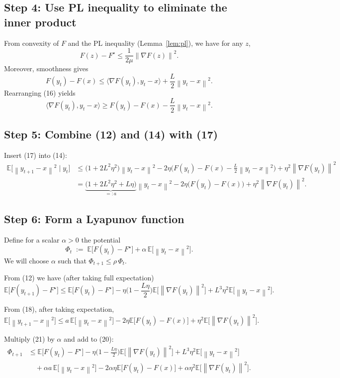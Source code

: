 \documentclass{article}
\newcommand{\EE}{\mathbb{E}}
\newcommand{\norm}[1]{\left\|#1\right\|}
\newcommand{\inner}[2]{\langle #1,#2\rangle}
\begin{document}
\subsection*{Step 4: Use PL inequality to eliminate the inner product}
From convexity of $F$ and the PL inequality (Lemma~\ref{lem:pl}), we have for any $z$,
\[
F(z)-F^\star \le \frac{1}{2\mu}\norm{\nabla F(z)}^{2}.
\tag{15}
\]
Moreover, smoothness gives
\[
F(y_t)-F(x) \le \inner{\nabla F(y_t)}{y_t-x}
          +\frac{L}{2}\norm{y_t-x}^{2}.
\tag{16}
\]
Rearranging (16) yields
\[
\inner{\nabla F(y_t)}{y_t-x}
   \ge F(y_t)-F(x)-\frac{L}{2}\norm{y_t-x}^{2}.
\tag{17}
\]

\subsection*{Step 5: Combine (12) and (14) with (17)}
Insert (17) into (14):
\[
\begin{aligned}
\EE\!\big[\norm{y_{t+1}-x}^{2}\mid y_t\big]
&\le \big(1+2L^{2}\eta^{2}\big)\norm{y_t-x}^{2}
   -2\eta\Big(F(y_t)-F(x)-\frac{L}{2}\norm{y_t-x}^{2}\Big)
   +\eta^{2}\norm{\nabla F(y_t)}^{2}\\
&= \underbrace{\big(1+2L^{2}\eta^{2}+L\eta\big)}_{=:a}\norm{y_t-x}^{2}
   -2\eta\big(F(y_t)-F(x)\big)
   +\eta^{2}\norm{\nabla F(y_t)}^{2}.
\end{aligned}
\tag{18}
\]

\subsection*{Step 6: Form a Lyapunov function}
Define for a scalar $\alpha>0$ the potential
\[
\Phi_t \;:=\; \EE\!\big[F(y_t)-F^\star\big]
            +\alpha\,\EE\!\big[\norm{y_t-x}^{2}\big].
\tag{19}
\]
We will choose $\alpha$ such that $\Phi_{t+1}\le\rho\,\Phi_t$.

From (12) we have (after taking full expectation)
\[
\EE\!\big[F(y_{t+1})-F^\star\big]
\le \EE\!\big[F(y_t)-F^\star\big]
   -\eta\Big(1-\frac{L\eta}{2}\Big)\EE\!\big[\norm{\nabla F(y_t)}^{2}\big]
   +L^{3}\eta^{2}\EE\!\big[\norm{y_t-x}^{2}\big].
\tag{20}
\]

From (18), after taking expectation,
\[
\EE\!\big[\norm{y_{t+1}-x}^{2}\big]
\le a\,\EE\!\big[\norm{y_t-x}^{2}\big]
   -2\eta\EE\!\big[F(y_t)-F(x)\big]
   +\eta^{2}\EE\!\big[\norm{\nabla F(y_t)}^{2}\big].
\tag{21}
\]

Multiply (21) by $\alpha$ and add to (20):
\[
\begin{aligned}
\Phi_{t+1}
&\le \EE\!\big[F(y_t)-F^\star\big]
   -\eta\Big(1-\frac{L\eta}{2}\Big)\EE\!\big[\norm{\nabla F(y_t)}^{2}\big]
   +L^{3}\eta^{2}\EE\!\big[\norm{y_t-x}^{2}\big] \\
&\quad +\alpha a\,\EE\!\big[\norm{y_t-x}^{2}\big]
   -2\alpha\eta\EE\!\big[F(y_t)-F(x)\big]
   +\alpha\eta^{2}\EE\!\big[\norm{\nabla F(y_t)}^{2}\big].
\end{aligned}
\tag{22}
\]
\end{document}
